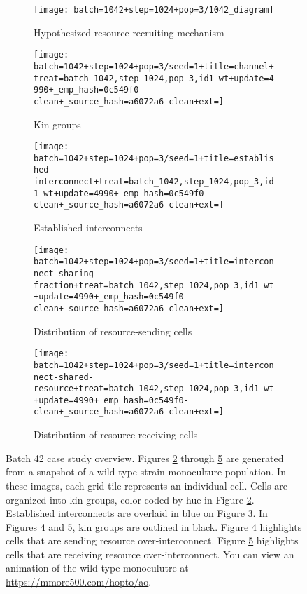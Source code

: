 \begin{figure}[!htbp]
\begin{center}
\begin{subfigure}[b]{\linewidth}
  \texttt{[image: batch=1042+step=1024+pop=3/1042\_diagram]}
  \caption{Hypothesized resource-recruiting mechanism}
  \label{fig:mechanism1}
\end{subfigure}
\begin{subfigure}[b]{0.45\linewidth}
  \texttt{[image: batch=1042+step=1024+pop=3/seed=1+title=channel+treat=batch\_1042,step\_1024,pop\_3,id1\_wt+update=4990+\_emp\_hash=0c549f0-clean+\_source\_hash=a6072a6-clean+ext=]}
  \caption{Kin groups}
  \label{fig:kingroups1}
\end{subfigure}
\begin{subfigure}[b]{0.45\linewidth}
  \texttt{[image: batch=1042+step=1024+pop=3/seed=1+title=established-interconnect+treat=batch\_1042,step\_1024,pop\_3,id1\_wt+update=4990+\_emp\_hash=0c549f0-clean+\_source\_hash=a6072a6-clean+ext=]}
  \caption{Established interconnects}
  \label{fig:establishedinterconnects1}
\end{subfigure}
\begin{subfigure}[b]{0.45\linewidth}
  \texttt{[image: batch=1042+step=1024+pop=3/seed=1+title=interconnect-sharing-fraction+treat=batch\_1042,step\_1024,pop\_3,id1\_wt+update=4990+\_emp\_hash=0c549f0-clean+\_source\_hash=a6072a6-clean+ext=]}
  \caption{Distribution of resource-sending cells}
  \label{fig:resourcesendingdistribution}
\end{subfigure}
\begin{subfigure}[b]{0.45\linewidth}
  \texttt{[image: batch=1042+step=1024+pop=3/seed=1+title=interconnect-shared-resource+treat=batch\_1042,step\_1024,pop\_3,id1\_wt+update=4990+\_emp\_hash=0c549f0-clean+\_source\_hash=a6072a6-clean+ext=]}
  \caption{Distribution of resource-receiving cells}
  \label{fig:resourcereceivingdistribution}
\end{subfigure}
\caption{
Batch 42 case study overview.
Figures \ref{fig:kingroups1} through \ref{fig:resourcereceivingdistribution} are generated from a snapshot of a wild-type strain monoculture population.
In these images, each grid tile represents an individual cell.
Cells are organized into kin groups, color-coded by hue in Figure \ref{fig:kingroups1}.
Established interconnects are overlaid in blue on Figure \ref{fig:establishedinterconnects1}.
In Figures \ref{fig:resourcesendingdistribution} and \ref{fig:resourcereceivingdistribution}, kin groups are outlined in black.
Figure \ref{fig:resourcesendingdistribution} highlights cells that are sending resource over-interconnect.
Figure \ref{fig:resourcereceivingdistribution} highlights cells that are receiving resource over-interconnect.
You can view an animation of the wild-type monoculutre at \url{https://mmore500.com/hopto/ao}.
}
\label{fig:case_study_1042}
\end{center}
\end{figure}
